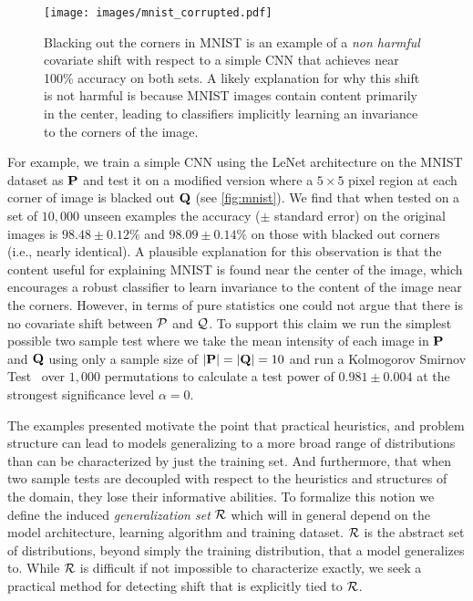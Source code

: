 \begin{wrapfigure}{r}{0.5\textwidth}
    \vspace{-8mm}
    \begin{center}
        \texttt{[image: images/mnist\_corrupted.pdf]}
    \end{center}
    \vspace{4mm}
    \caption{\small Blacking out the corners in MNIST is an example of a \textit{non harmful} covariate shift with respect to a simple CNN that achieves near 100\% accuracy on both sets.
    A likely explanation for why this shift is not harmful is because MNIST images contain content primarily in the center, leading to classifiers implicitly learning an invariance to the corners
    of the image.}
    \label{fig:mnist}
    \vspace{-8mm}
\end{wrapfigure}
For example, we train a simple CNN using the LeNet architecture on the MNIST dataset as $\mathbf{P}$ and test it on a modified version where a $5\times 5$ pixel region at each corner of image is blacked out $\mathbf{Q}$ (see \autoref{fig:mnist}).
We find that when tested on a set of $10,000$ unseen examples the accuracy ($\pm$ standard error) on the original images is $98.48\pm 0.12 \%$ and $98.09\pm 0.14 \%$ on those with blacked out corners (i.e., nearly identical).
A plausible explanation for this observation is that the content useful for explaining MNIST is found near the center of the image,
which encourages a robust classifier to learn invariance to the content of the image near the corners.
However, in terms of pure statistics one could not argue that there is no covariate shift between $\mathcal{P}$ and $\mathcal{Q}$.
To support this claim we run the simplest possible two sample test where we take the mean intensity of each image in $\mathbf{P}$ and $\mathbf{Q}$ using only a sample size of $|\mathbf{P}|=|\mathbf{Q}|=10$ and
run a Kolmogorov Smirnov Test~\citep{kstest} over $1,000$ permutations to calculate a test power of $0.981\pm 0.004$ at the strongest significance level $\alpha=0$.

The examples presented motivate the point that practical heuristics, and problem structure can lead to models generalizing to a more broad range of distributions than can be characterized by just the training set.
And furthermore, that when two sample tests are decoupled with respect to the heuristics and structures of the domain, they lose their informative abilities.
To formalize this notion we define the induced \textit{generalization set} $\mathcal{R}$ which will in general depend on the model architecture, learning algorithm and training dataset.
$\mathcal{R}$ is the abstract set of distributions, beyond simply the training distribution, that a model generalizes to.
While $\mathcal{R}$ is difficult if not impossible to characterize exactly, we seek a practical method for detecting shift that is explicitly tied to $\mathcal{R}$.

